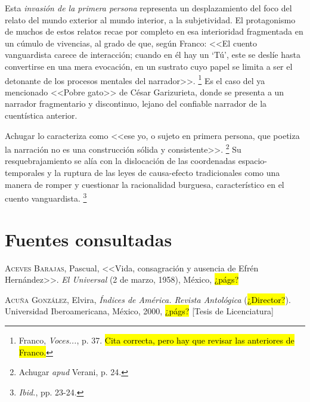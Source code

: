 \documentclass[14pt,twoside,final]{extbook} %
\let\oldfootnote\footnote
\renewcommand\footnote[1]{%
\oldfootnote{\hspace{1mm}#1}}
\begin{document}
Esta \emph{invasión de la primera persona} representa un desplazamiento del foco del relato del mundo exterior al mundo interior, a la subjetividad. El protagonismo de muchos de estos relatos recae por completo en esa interioridad fragmentada en un cúmulo de vivencias, al grado de que, según Franco: <<El cuento vanguardista carece
de interacción; cuando en él hay un `Tú', este se deslíe hasta convertirse en una
mera evocación, en un sustrato cuyo papel se limita a ser el detonante de los
procesos mentales del narrador>>.\footnote{Franco, \emph{Voces...}, p. 37. \hl{Cita correcta, pero hay que revisar las anteriores de Franco.}} Es el caso del ya mencionado <<Pobre gato>> de César Garizurieta, donde se presenta a un narrador fragmentario y discontinuo, lejano del confiable narrador de la cuentística anterior.

Achugar lo caracteriza como <<ese yo, o sujeto en primera persona, que poetiza la narración no es una construcción sólida y consistente>>.\footnote{Achugar \emph{apud} Verani, p. 24.} Su resquebrajamiento se alía con la dislocación de las coordenadas espacio-temporales y la ruptura de las leyes de causa-efecto tradicionales como una manera de romper y cuestionar la racionalidad burguesa, característico en el cuento vanguardista.\footnote{\emph{Ibid.}, pp. 23-24.}

\chapter*{Fuentes consultadas}\label{ch:fuentes-consultadas}
\thispagestyle{empty}
\pagestyle{fancy}
\fancyhf{} %
\fancyhead[RO,LE]{\thepage}
\renewcommand{\headrulewidth}{0.4pt}
\setcounter{page}{51}
\textsc{Aceves Barajas}, Pascual, <<Vida, consagración y ausencia de Efrén Hernández>>. \emph{El Universal} (2 de marzo, 1958), México, \hl{¿págs?} \label{bib:aceves1958}

\textsc{Acuña González}, Elvira, \emph{Índices de \emph{América}. Revista Antológica} (\hl{¿Director?}). Universidad Iberoamericana, México, 2000, \hl{¿págs?} [Tesis de Licenciatura]\label{bib:acuña2000}
\end{document}
